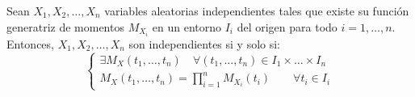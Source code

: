 \begin{coro}\label{coro:generatriz_momentos_independientes}
    Sean $X_1,X_2,\ldots,X_n$ variables aleatorias independientes tales que existe su función generatriz de momentos $M_{X_i}$ en un entorno $I_i$ del origen para todo $i=1,\dots,n$. Entonces, $X_1,X_2,\ldots,X_n$ son independientes si y solo si:
    \[
            \left\{
                \begin{array}{l}
                    \exists M_X(t_1, \ldots, t_n) \quad \forall (t_1, \ldots, t_n) \in I_1 \times \ldots \times I_n \\
                    M_X(t_1,\dots,t_n)=\prod\limits_{i=1}^n M_{X_i}(t_i)\qquad \forall t_i\in I_i
                \end{array}
            \right.
        \]

\end{coro}
